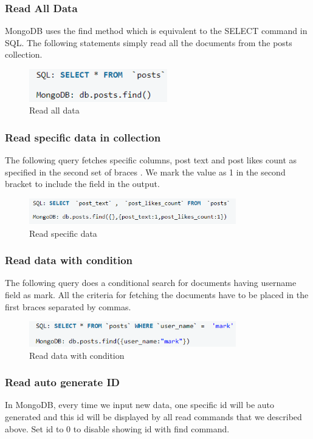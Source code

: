 \documentclass[conference]{IEEEtran}
\begin{document}
\subsubsection{Read All Data}
MongoDB uses the find method which is equivalent to the SELECT command in SQL. The following statements simply read all the documents from the posts collection.
\begin{figure}[H]
    \centering
    \includegraphics[width=6cm]{read1}
    \caption{Read all data}
    \label{fig:fig4}
\end{figure}
\subsubsection{Read specific data in collection}
The following query fetches specific columns, post text  and post likes count as specified in the second set of braces {}. We mark the value as 1 in the second bracket to include the field in the output.
\begin{figure}[H]
    \centering
    \includegraphics[width=9cm]{read2}
    \caption{Read specific data}
    \label{fig:fig4}
\end{figure}
\subsubsection{Read data with condition}
The following query does a conditional search for documents having username field as mark. All the criteria for fetching the documents have to be placed in the first braces {} separated by commas.
\begin{figure}[H]
    \centering
    \includegraphics[width=9cm]{read3}
    \caption{Read data with condition}
    \label{fig:fig4}
\end{figure}
\subsubsection{Read auto generate ID}
In MongoDB, every time we input new data, one specific id will be auto generated and this id will be displayed by all read commands that we described above. Set id to 0 to disable showing id with find command.
\end{document}

